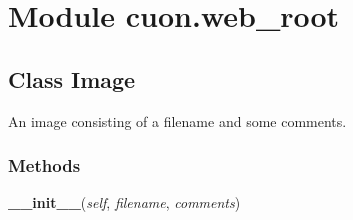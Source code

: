 %
%
%


\section{Module cuon.web\_root}

    \label{cuon:web_root}


\subsection{Class Image}

    \label{cuon:web_root:Image}
An image consisting of a filename and some comments.



  \subsubsection{Methods}

    \label{cuon:web_root:Image:__init__}

    \vspace{0.5ex}

\hspace{.8\funcindent}\begin{boxedminipage}{\funcwidth}

    \raggedright \textbf{\_\_init\_\_}(\textit{self}, \textit{filename}, \textit{comments})

\setlength{\parskip}{2ex}
\setlength{\parskip}{1ex}
    \end{boxedminipage}

